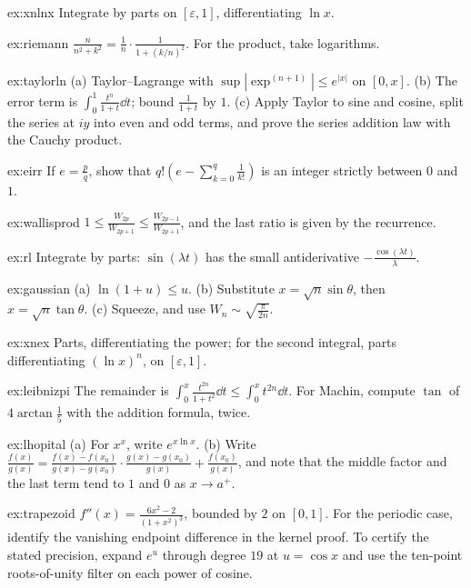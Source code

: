 \begin{hint}{ex:xnlnx}
Integrate by parts on $[\varepsilon,1]$, differentiating $\ln x$.
\end{hint}
\begin{hint}{ex:riemann}
$\frac n{n^2+k^2}=\frac1n\cdot\frac1{1+(k/n)^2}$. For the product, take logarithms.
\end{hint}
\begin{hint}{ex:taylorln}
(a) Taylor--Lagrange with $\sup|\exp^{(n+1)}|\le e^{|x|}$ on $[0,x]$. (b) The error term is $\int_0^1\frac{t^n}{1+t}\dd t$; bound $\frac1{1+t}$ by $1$. (c) Apply Taylor to sine and cosine, split the series at $iy$
into even and odd terms, and prove the series addition law with the Cauchy product.
\end{hint}
\begin{hint}{ex:eirr}
If $e=\frac pq$, show that $q!\left(e-\sum_{k=0}^q\frac1{k!}\right)$ is an integer strictly between $0$ and $1$.
\end{hint}
\begin{hint}{ex:wallisprod}
$1\le\frac{W_{2p}}{W_{2p+1}}\le\frac{W_{2p-1}}{W_{2p+1}}$, and the last ratio is given by the recurrence.
\end{hint}
\begin{hint}{ex:rl}
Integrate by parts: $\sin(\lambda t)$ has the small antiderivative $-\frac{\cos(\lambda t)}\lambda$.
\end{hint}
\begin{hint}{ex:gaussian}
(a) $\ln(1+u)\le u$. (b) Substitute $x=\sqrt n\sin\theta$, then $x=\sqrt n\tan\theta$. (c) Squeeze, and use $W_n\sim\sqrt{\frac\pi{2n}}$.
\end{hint}
\begin{hint}{ex:xnex}
Parts, differentiating the power; for the second integral, parts differentiating $(\ln x)^n$, on $[\varepsilon,1]$.
\end{hint}
\begin{hint}{ex:leibnizpi}
The remainder is $\int_0^x\frac{t^{2n}}{1+t^2}\dd t\le\int_0^xt^{2n}\dd t$. For Machin, compute $\tan$ of $4\arctan\frac15$ with the addition formula, twice.
\end{hint}
\begin{hint}{ex:lhopital}
(a) For $x^x$, write $e^{x\ln x}$. (b) Write $\frac{f(x)}{g(x)}=\frac{f(x)-f(x_0)}{g(x)-g(x_0)}\cdot\frac{g(x)-g(x_0)}{g(x)}+\frac{f(x_0)}{g(x)}$, and note that the middle factor and the last term tend to $1$ and $0$ as $x\to a^+$.
\end{hint}
\begin{hint}{ex:trapezoid}
$f''(x)=\frac{6x^2-2}{(1+x^2)^3}$, bounded by $2$ on $[0,1]$. For the periodic case, identify the vanishing endpoint difference in the
kernel proof. To certify the stated precision, expand $e^u$ through degree $19$
at $u=\cos x$ and use the ten-point roots-of-unity filter on each power of cosine.
\end{hint}
